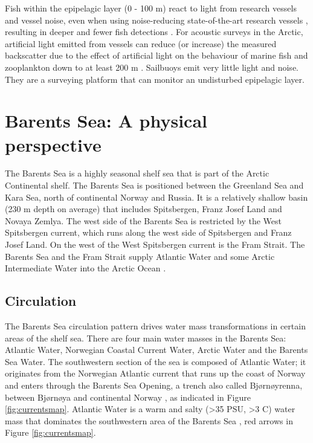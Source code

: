\documentclass[a4paper, 12pt, Ariel]{article}
\begin{document}
Fish within the epipelagic layer (0 - 100 m) react to light from research vessels \cite{Ludvigsen2018} and vessel noise, even when using noise-reducing state-of-the-art research vessels \cite{Ona2007}, resulting in deeper and fewer fish detections \cite{DeRobertis2019}. For acoustic surveys in the Arctic, artificial light emitted from vessels can reduce (or increase) the measured backscatter due to the effect of artificial light on the behaviour of marine fish and zooplankton down to at least 200 m \cite{Berge2020}. Sailbuoys emit very little light and noise. They are a surveying platform that can monitor an undisturbed epipelagic layer. \\

 


\section{Barents Sea: A physical perspective}
The Barents Sea is a highly seasonal shelf sea that is part of the Arctic Continental shelf. The Barents Sea is positioned between the Greenland Sea and Kara Sea, north of continental Norway and Russia. It is a relatively shallow basin (230 m depth on average) that includes Spitsbergen, Franz Josef Land and Novaya Zemlya. The west side of the Barents Sea is restricted by the West Spitsbergen current, which runs along the west side of Spitsbergen and Franz Josef Land. On the west of the West Spitsbergen current is the Fram Strait. The Barents Sea and the Fram Strait supply Atlantic Water and some Arctic Intermediate Water into the Arctic Ocean \cite{Rudels1994}.

\subsection{Circulation}
The Barents Sea circulation pattern drives water mass transformations in certain areas of the shelf sea. There are four main water masses in the Barents Sea: Atlantic Water, Norwegian Coastal Current Water, Arctic Water and the Barents Sea Water. The southwestern section of the sea is composed of Atlantic Water; it originates from the Norwegian Atlantic current that runs up the coast of Norway and enters through the Barents Sea Opening, a trench also called Bjørnøyrenna, between Bjørnøya and continental Norway \cite{Ingvaldsen2002}, as indicated in Figure \ref{fig:currentsmap}. Atlantic Water is a warm and salty (\textgreater 35 PSU, \textgreater 3 \degree C) water mass that dominates the southwestern area of the Barents Sea \cite{Sakshaug2009}, red arrows in Figure \ref{fig:currentsmap}. \\
\end{document}
